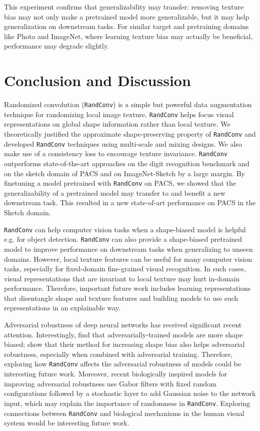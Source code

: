 \documentclass{article} \usepackage{iclr2021_conference,times}
\newcommand{\RandConv}{\texttt{RandConv}}
\begin{document}
This experiment confirms that generalizability may transfer: removing texture bias may not only make a pretrained model more generalizable, but it may help generalization on downstream tasks. For similar target and pretraining domains like Photo and ImageNet, where learning texture bias may actually be beneficial, performance may degrade slightly.

\vspace{-1mm}
\section{Conclusion and Discussion}
Randomized convolution ({\RandConv}) is a simple but powerful data augmentation technique for randomizing local image texture. {\RandConv} helps focus visual representations on global shape information rather than local texture. We theoretically justified the approximate shape-preserving property of {\RandConv} and developed {\RandConv} techniques using multi-scale and mixing designs. We also make use of a consistency loss to encourage texture invariance. 
{\RandConv} outperforms state-of-the-art approaches on the digit recognition benchmark and on the sketch domain of PACS and on ImageNet-Sketch by a large margin. By finetuning a model pretrained with {\RandConv} on PACS, we showed that the generalizability of a pretrained model may transfer to and benefit a new downstream task. This resulted in a new state-of-art performance on PACS in the Sketch domain. 

{{\RandConv} can help computer vision tasks when a shape-biased model is helpful e.g. for object detection. {\RandConv} can also provide a shape-biased pretrained model to improve performance on downstream tasks when generalizing to unseen domains.}
However, local texture features can be useful for many computer vision tasks, especially for fixed-domain fine-grained visual recognition. In such cases, visual representations that are invariant to local texture 
may hurt in-domain performance. Therefore, important future work includes learning representations that disentangle shape and texture features and building models to use such representations in an explainable way. 

{Adversarial robustness of deep neural networks has received significant recent attention. Interestingly, \cite{zhang2019interpreting} find that adversarially-trained models are more shape biased; \cite{shi2020informative} show that their method for increasing shape bias also helps adversarial robustness, especially when combined with adversarial training. Therefore, exploring how {\RandConv} affects the adversarial robustness of models could be interesting future work. Moreover, recent biologically inspired models for improving adversarial robustness \citep{dapello2020simulating} use Gabor filters with fixed random configurations followed by a stochastic layer to add Gaussian noise to the network input, which may explain the importance of randomness in {\RandConv}. Exploring connections between {\RandConv} and biological mechanisms in the human visual system would be interesting future work. }
\end{document}
